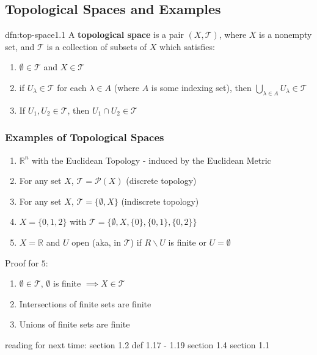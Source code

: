 \documentclass{article}
\begin{document}
\subsection{Topological Spaces and Examples}
\begin{dfn}{dfn:top-space}{1.1}
    A \textbf{topological space} is a pair $(X, \mathcal{T})$, where $X$ is a nonempty set, and $\mathcal{T}$ is a collection of subsets of $X$ which satisfies:
    \begin{enumerate}
        \item $\emptyset\in \mathcal{T}$ and $X\in \mathcal{T}$
        \item if $U_{\lambda}\in \mathcal{T}$ for each $\lambda\in A$ (where $A$ is some indexing set), then $\bigcup\limits_{\lambda \in A} U_{\lambda}\in \mathcal{T}$
        \item If $U_{1}, U_{2}\in \mathcal{T}$, then $U_{1} \cap U_{2}\in \mathcal{T}$
    \end{enumerate}
\end{dfn}

\subsubsection{Examples of Topological Spaces}
\begin{enumerate}
    \item $\mathbb{R}^{n}$ with the Euclidean Topology - induced by the Euclidean Metric
    \item For any set $X$, $\mathcal{T} = \mathcal{P}(X)$ (discrete topology)
    \item For any set $X$, $\mathcal{T} = \{\emptyset, X\}$ (indiscrete topology)
    \item $X = \{0,1,2\}$ with $\mathcal{T} = \{\emptyset, X, \{0\}, \{0,1\}, \{0,2\}\}$
    \item $X = \mathbb{R}$ and $U$ open (aka, in $\mathcal{T}$) if $R \backslash U$ is finite or $U = \emptyset$
\end{enumerate}
Proof for $5$:
\begin{enumerate}
    \item $\emptyset\in \mathcal{T}$, $\emptyset$ is finite $\implies X \in \mathcal{T}$
    \item Intersections of finite sets are finite
    \item Unions of finite sets are finite
\end{enumerate}

reading for next time: 
section 1.2 def 1.17 - 1.19
section 1.4
section 1.1
\end{document}
